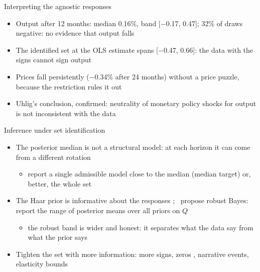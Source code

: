 \begin{frame}{Interpreting the agnostic responses}
\itemsize{\small}
\begin{itemize}
    \item Output after 12 months: median 0.16\%, band [\ensuremath{-}0.17, 0.47]; 32\% of draws negative: no evidence that output falls
    \item The identified set at the OLS estimate spans [\ensuremath{-}0.47, 0.66]: the data with the signs cannot sign output
    \item Prices fall persistently (\ensuremath{-}0.34\% after 24 months) without a price puzzle, because the restriction rules it out
    \item Uhlig's conclusion, confirmed: neutrality of monetary policy shocks for output is not inconsistent with the data
\end{itemize}
\end{frame}

\begin{frame}{Inference under set identification}
\itemsize{\small}
\begin{itemize}
    \item The posterior median is not a structural model: at each horizon it can come from a different rotation 
    \begin{itemize}
        \item report a single admissible model close to the median (median target) or, better, the whole set
    \end{itemize}
    \item The Haar prior is informative about the responses ; \ propose robust Bayes: report the range of posterior means over all priors on $Q$
    \begin{itemize}
        \item the robust band is wider and honest: it separates what the data say from what the prior says
    \end{itemize}
    \item Tighten the set with more information: more signs, zeros , narrative events, elasticity bounds 
\end{itemize}
\end{frame}

